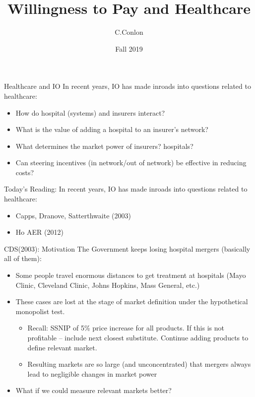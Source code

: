 \documentclass[xcolor=pdftex,dvipsnames,table,mathserif,aspectratio=169]{beamer}
\title [Healthcare and IO]{Willingness to Pay and Healthcare}
\author{C.Conlon }
\institute{Grad IO }
\date{Fall 2019}
\begin{document}
\begin{frame}
\titlepage
\end{frame}


\begin{frame}{Healthcare and IO}
In recent years, IO has made inroads into questions related to healthcare:
\begin{itemize}
\item How do hospital (systems) and insurers interact?
\item What is the value of adding a hospital to an insurer's network?
\item What determines the market power of insurers? hospitals?
\item Can steering incentives (in network/out of network) be effective in reducing costs?
\end{itemize}
\end{frame}

\begin{frame}{Today's Reading:}
In recent years, IO has made inroads into questions related to healthcare:
\begin{itemize}
\item Capps, Dranove, Satterthwaite (2003)
\item Ho AER (2012)
\end{itemize}
\end{frame}



\begin{frame}{CDS(2003): Motivation}
The Government keeps losing hospital mergers (basically all of them):
\begin{itemize}
\item Some people travel enormous distances to get treatment at hospitals (Mayo Clinic, Cleveland Clinic, Johns Hopkins, Mass General, etc.)
\item These cases are lost at the stage of \alert{market definition} under the \alert{hypothetical monopolist test}.
\begin{itemize}
\item Recall: SSNIP of 5\% price increase for all products. If this is not profitable -- include next closest substitute. Continue adding products to define relevant market.
\item Resulting markets are so large (and unconcentrated) that mergers always lead to negligible changes in market power
\end{itemize}
\item What if we could measure relevant markets better?
\end{itemize}
\end{frame} 
\end{document}
